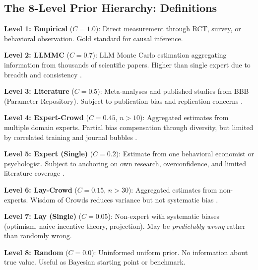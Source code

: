 \subsection{The 8-Level Prior Hierarchy: Definitions}
\label{sec:ie-prior-hierarchy}

\begin{tcolorbox}[colback=blue!5!white, colframe=blue!75!black,
    title=\textbf{Definition IE-D2: The 8-Level Prior Hierarchy}]

\textbf{Level 1: Empirical} ($C = 1.0$): Direct measurement through RCT, survey, or behavioral observation. Gold standard for causal inference.

\textbf{Level 2: LLMMC} ($C = 0.7$): LLM Monte Carlo estimation aggregating information from thousands of scientific papers. Higher than single expert due to breadth and consistency \citep{zhu2024eliciting, scientificreports2025llmpriors}.

\textbf{Level 3: Literature} ($C = 0.5$): Meta-analyses and published studies from BBB (Parameter Repository). Subject to publication bias and replication concerns \citep{camerer2016}.

\textbf{Level 4: Expert-Crowd} ($C = 0.45$, $n > 10$): Aggregated estimates from multiple domain experts. Partial bias compensation through diversity, but limited by correlated training and journal bubbles \citep{kahneman2015noise}.

\textbf{Level 5: Expert (Single)} ($C = 0.2$): Estimate from one behavioral economist or psychologist. Subject to anchoring on own research, overconfidence, and limited literature coverage \citep{PAP-dellavigna2016predict}.

\textbf{Level 6: Lay-Crowd} ($C = 0.15$, $n > 30$): Aggregated estimates from non-experts. Wisdom of Crowds reduces variance but not systematic bias \citep{surowiecki2004wisdom}.

\textbf{Level 7: Lay (Single)} ($C = 0.05$): Non-expert with systematic biases (optimism, naive incentive theory, projection). May be \textit{predictably wrong} rather than randomly wrong.

\textbf{Level 8: Random} ($C = 0.0$): Uninformed uniform prior. No information about true value. Useful as Bayesian starting point or benchmark.

\end{tcolorbox}

